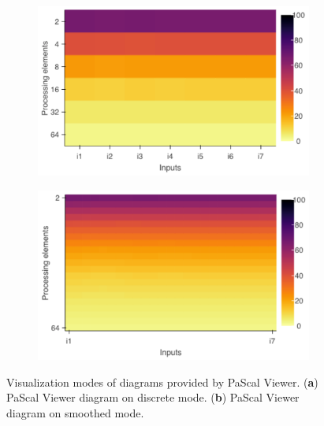 \begin{figure}[H]
	\begin{subfigure}[b]{0.45\textwidth}
		\includegraphics[width=\textwidth]{pascalanalyzer/figures/results/diagram_discretevalues.pdf}
		\label{fig:discretevalues}
	\end{subfigure}
	\begin{subfigure}[b]{0.45\textwidth}
		\includegraphics[width=\textwidth]{pascalanalyzer/figures/results/diagram_smoothedvalues.pdf}
		\label{fig:smoothedvalues}
	\end{subfigure}
	
	\caption{Visualization modes of diagrams provided by PaScal Viewer. (\textbf{a}) PaScal Viewer diagram on discrete mode. (\textbf{b}) PaScal Viewer diagram on smoothed mode.}
	\label{fig:visualizationmodes}
\end{figure}



